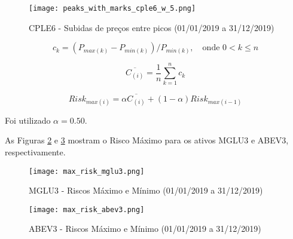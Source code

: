 \begin{itemize}
    \begin{figure}[!htb]
        \texttt{[image: peaks\_with\_marks\_cple6\_w\_5.png]}
        \centering
        \caption{CPLE6 - Subidas de preços entre picos (01/01/2019 a 31/12/2019)}
        \label{fig:107}
    \end{figure}

    \begin{equation} \label{eq:40}
        c_k = (P_{max(k)} - P_{min(k)}) / P_{min(k)}, \quad \textrm{onde } 0 < k \le n
    \end{equation}

    \begin{equation} \label{eq:41}
        \overline{C_{(i)}} = \dfrac{1}{n} \sum_{k=1}^{n} c_k
    \end{equation}

    \begin{equation} \label{eq:42}
        Risk_{max(i)} = \alpha \overline{C_{(i)}} + (1 - \alpha) Risk_{max(i-1)}
    \end{equation}




    Foi utilizado \begin{math} \alpha = 0.50 \end{math}.

    As Figuras \ref{fig:108} e \ref{fig:270} mostram o Risco Máximo para os ativos MGLU3 e ABEV3, respectivamente.

    \begin{figure}[!htb]
        \texttt{[image: max\_risk\_mglu3.png]}
        \centering
        \caption{MGLU3 - Riscos Máximo e Mínimo (01/01/2019 a 31/12/2019)}
        \label{fig:108}
    \end{figure}

    \begin{figure}[!htb]
        \texttt{[image: max\_risk\_abev3.png]}
        \centering
        \caption{ABEV3 - Riscos Máximo e Mínimo (01/01/2019 a 31/12/2019)}
        \label{fig:270}
    \end{figure}

\end{itemize}



